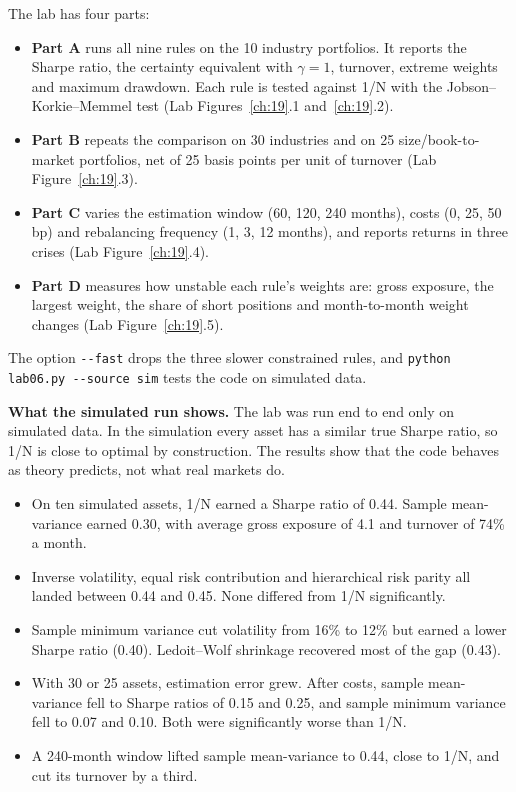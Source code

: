 The lab has four parts:

\begin{itemize}
  \item \textbf{Part A} runs all nine rules on the 10 industry portfolios. It reports the Sharpe ratio, the certainty equivalent with $\gamma = 1$, turnover, extreme weights and maximum drawdown. Each rule is tested against 1/N with the Jobson--Korkie--Memmel test (Lab Figures~\ref{ch:19}.1 and~\ref{ch:19}.2).
  \item \textbf{Part B} repeats the comparison on 30 industries and on 25 size/book-to-market portfolios, net of 25 basis points per unit of turnover (Lab Figure~\ref{ch:19}.3).
  \item \textbf{Part C} varies the estimation window (60, 120, 240 months), costs (0, 25, 50 bp) and rebalancing frequency (1, 3, 12 months), and reports returns in three crises (Lab Figure~\ref{ch:19}.4).
  \item \textbf{Part D} measures how unstable each rule's weights are: gross exposure, the largest weight, the share of short positions and month-to-month weight changes (Lab Figure~\ref{ch:19}.5).
\end{itemize}

{\sloppy The option \texttt{-{}-fast} drops the three slower constrained rules, and \texttt{python lab06.py -{}-source sim} tests the code on simulated data.\par}

\textbf{What the simulated run shows.} The lab was run end to end only on simulated data. In the simulation every asset has a similar true Sharpe ratio, so 1/N is close to optimal by construction. The results show that the code behaves as theory predicts, not what real markets do.

\begin{itemize}
  \item On ten simulated assets, 1/N earned a Sharpe ratio of 0.44. Sample mean-variance earned 0.30, with average gross exposure of 4.1 and turnover of 74\% a month.
  \item Inverse volatility, equal risk contribution and hierarchical risk parity all landed between 0.44 and 0.45. None differed from 1/N significantly.
  \item Sample minimum variance cut volatility from 16\% to 12\% but earned a lower Sharpe ratio (0.40). Ledoit--Wolf shrinkage recovered most of the gap (0.43).
  \item With 30 or 25 assets, estimation error grew. After costs, sample mean-variance fell to Sharpe ratios of 0.15 and 0.25, and sample minimum variance fell to 0.07 and 0.10. Both were significantly worse than 1/N.
  \item A 240-month window lifted sample mean-variance to 0.44, close to 1/N, and cut its turnover by a third.
\end{itemize}

